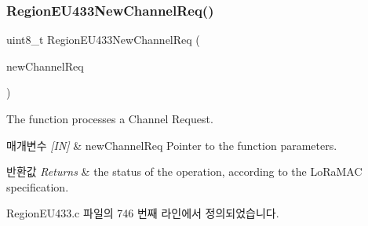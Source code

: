 \subsubsection{\texorpdfstring{Region\+E\+U433\+New\+Channel\+Req()}{RegionEU433NewChannelReq()}}
{\footnotesize\ttfamily uint8\+\_\+t Region\+E\+U433\+New\+Channel\+Req (\begin{DoxyParamCaption}\item[{\mbox{\hyperlink{group___r_e_g_i_o_n_gae2abcdb6dbb843c9faf5fd3009eca9d6}{New\+Channel\+Req\+Params\+\_\+t}} $\ast$}]{new\+Channel\+Req }\end{DoxyParamCaption})}



The function processes a Channel Request. 


\begin{DoxyParams}{매개변수}
{\em \mbox{[}\+I\+N\mbox{]}} & new\+Channel\+Req Pointer to the function parameters.\\
\hline
\end{DoxyParams}

\begin{DoxyRetVals}{반환값}
{\em Returns} & the status of the operation, according to the Lo\+Ra\+M\+AC specification. \\
\hline
\end{DoxyRetVals}


Region\+E\+U433.\+c 파일의 746 번째 라인에서 정의되었습니다.


